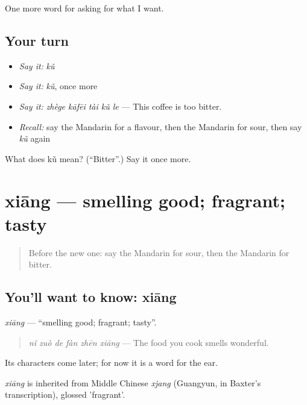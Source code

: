 \begin{grammarlens}[title={What you've built}]
One more word for asking for what I want.
\end{grammarlens}

\subsection*{Your turn}
\begin{itemize}
\raggedright
  \item \emph{Say it:} \emph{kǔ}
  \item \emph{Say it:} \emph{kǔ}, once more
  \item \emph{Say it:} \emph{zhège kāfēi tài kǔ le} — This coffee is too bitter.
  \item \emph{Recall:} say the Mandarin for a flavour, then the Mandarin for sour, then say \emph{kǔ} again
\end{itemize}

\begin{tcolorbox}[breakable,colback=teal!4,colframe=teal!35!black,title={Before you move on}]
What does kǔ mean? (\textquotedblleft{}Bitter\textquotedblright{}.) Say it once more.
\end{tcolorbox}
\section[xiāng]{xiāng — smelling good; fragrant; tasty}

\label{lesson:ZH-C172-xiang}



\begin{quote}
Before the new one: say the Mandarin for sour, then the Mandarin for bitter.
\end{quote}

\subsection*{You'll want to know: xiāng}
\emph{xiāng} — \textquotedblleft{}smelling good; fragrant; tasty\textquotedblright{}.

\begin{quote}
\emph{nǐ zuò de fàn zhēn xiāng} — The food you cook smells wonderful.
\end{quote}

Its characters come later; for now it is a word for the ear.

\begin{cousinweb}
\emph{xiāng} is inherited from Middle Chinese \emph{xjang} (Guangyun, in Baxter's transcription), glossed 'fragrant'.
\end{cousinweb}

